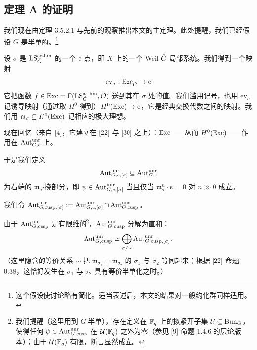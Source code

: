 \subsection{定理 A 的证明}

我们现在由定理 3.5.2.1 与先前的观察推出本文的主定理。此处提醒，我们已经假设 $G$ 是半单的。\footnote{这个假设使讨论略有简化。适当表述后，本文的结果对一般约化群同样适用。}%


设 $\sigma$ 是 $\mathrm{LS}^{\mathrm{arthm}}_{\check{G}}$ 的一个 $\mathrm{e}$-点，即 $X$ 上的一个 Weil $\check{G}$-局部系统。我们得到一个映射
\[
  \mathrm{ev}_\sigma : \mathrm{Exc}_{\check{G}} \to \mathrm{e}
\]
它把函数 $f\in\mathrm{Exc}=\Gamma(\mathrm{LS}^{\mathrm{arthm}}_{\check{G}},\mathcal{O})$ 送到其在 $\sigma$ 处的值。我们滥用记号，也用 $\mathrm{ev}_\sigma$ 记诱导映射（通过取 $H^0$ 得到）$H^0(\mathrm{Exc})\to\mathrm{e}$，它是经典交换代数之间的映射。我们用 $\mathfrak m_\sigma\subseteq H^0(\mathrm{Exc})$ 记相应的极大理想。

现在回忆（来自 [4]，它建立在 [22] 与 [30] 之上）：$\mathrm{Exc}$——从而 $H^0(\mathrm{Exc})$——作用在 $\operatorname{Aut}^{\mathrm{unr}}_{G,c}$ 上。

于是我们定义
\[
  \operatorname{Aut}^{\mathrm{unr}}_{G,c,[\sigma]} \subseteq \operatorname{Aut}^{\mathrm{unr}}_{G,c}
\]
为右端的 $\mathfrak m_\sigma$-挠部分，即 $\psi\in\operatorname{Aut}^{\mathrm{unr}}_{G,c,[\sigma]}$ 当且仅当 $\mathfrak m_\sigma^n\cdot\psi=0$ 对 $n\gg 0$ 成立。

我们令 $\operatorname{Aut}^{\mathrm{unr}}_{G,\mathrm{cusp},[\sigma]} := \operatorname{Aut}^{\mathrm{unr}}_{G,c,[\sigma]}\cap\operatorname{Aut}^{\mathrm{unr}}_{G,\mathrm{cusp}}$。

\begin{warning}
由于 $\operatorname{Aut}^{\mathrm{unr}}_{G,\mathrm{cusp}}$ 是有限维的\footnote{我们提醒（这里用到 $G$ 半单），存在定义在 $\mathbb{F}_q$ 上的拟紧开子集 $\mathcal U\subseteq\mathrm{Bun}_G$，使得任何 $\psi\in\operatorname{Aut}^{\mathrm{unr}}_{G,\mathrm{cusp}}$ 在 $\mathcal U(\mathbb{F}_q)$ 之外为零（参见 [9] 命题 1.4.6 的层论版本）；由于 $\mathcal U(\mathbb{F}_q)$ 有限，断言显然成立。}，$\operatorname{Aut}^{\mathrm{unr}}_{G,\mathrm{cusp}}$ 分解为直和：
\begin{equation}
  \operatorname{Aut}^{\mathrm{unr}}_{G,\mathrm{cusp}} \simeq \bigoplus_{\sigma/\sim}\operatorname{Aut}^{\mathrm{unr}}_{G,\mathrm{cusp},[\sigma]}.
\end{equation}
（这里隐含的等价关系 $\sim$ 把 $\mathfrak m_{\sigma_1}=\mathfrak m_{\sigma_2}$ 的 $\sigma_1$ 与 $\sigma_2$ 等同起来；根据 [22] 命题 0.38，这恰好发生在 $\sigma_1$ 与 $\sigma_2$ 具有等价半单化之时。）
\end{warning}

